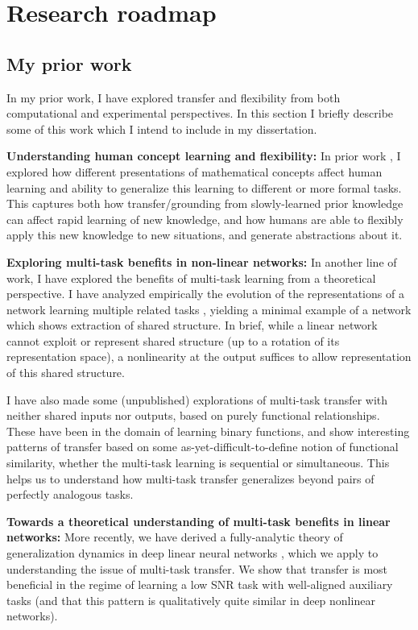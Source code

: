 \documentclass[11pt]{article}
\begin{document}
\section{Research roadmap}

\subsection{My prior work}
In my prior work, I have explored transfer and flexibility from both computational and experimental perspectives. In this section I briefly describe some of this work which I intend to include in my dissertation. \par

\textbf{Understanding human concept learning and flexibility:} In prior work \citep{Lampinen2017b}, I explored how different presentations of mathematical concepts affect human learning and ability to generalize this learning to different or more formal tasks. This captures both how transfer/grounding from slowly-learned prior knowledge can affect rapid learning of new knowledge, and how humans are able to flexibly apply this new knowledge to new situations, and generate abstractions about it. \par 
\textbf{Exploring multi-task benefits in non-linear networks:} In another line of work, I have explored the benefits of multi-task learning from a theoretical perspective. I have analyzed empirically the evolution of the representations of a network learning multiple related tasks \citep{Lampinen2017a}, yielding a minimal example of a network which shows extraction of shared structure. In brief, while a linear network cannot exploit or represent shared structure (up to a rotation of its representation space), a nonlinearity at the output suffices to allow representation of this shared structure. \par
I have also made some (unpublished) explorations of multi-task transfer with neither shared inputs nor outputs, based on purely functional relationships. These have been in the domain of learning binary functions, and show interesting patterns of transfer based on some as-yet-difficult-to-define notion of functional similarity, whether the multi-task learning is sequential or simultaneous. This helps us to understand how multi-task transfer generalizes beyond pairs of perfectly analogous tasks. \par
\textbf{Towards a theoretical understanding of multi-task benefits in linear networks:} More recently, we have derived a fully-analytic theory of generalization dynamics in deep linear neural networks \citep{Lampinen2019}, which we apply to understanding the issue of multi-task transfer. We show that transfer is most beneficial in the regime of learning a low SNR task with well-aligned auxiliary tasks (and that this pattern is qualitatively quite similar in deep nonlinear networks). \par 
\end{document}
